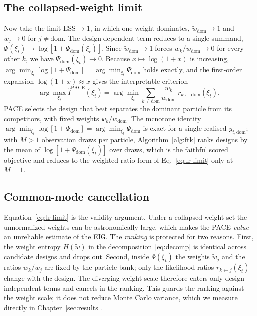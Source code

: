 \subsection{The collapsed-weight limit}
\label{sec:m-collapse}

Now take the limit $\mathrm{ESS}\to1$, in which one weight dominates,
$\tilde w_{\mathrm{dom}}\to1$ and $\tilde w_j\to0$ for $j\ne\mathrm{dom}$. The
design-dependent term reduces to a single summand,
$\bar\Phi(\xi_t)\to\log[1+\Psi_{\mathrm{dom}}(\xi_t)]$. Since $\tilde w_{\mathrm{dom}}\to1$
forces $w_k/w_{\mathrm{dom}}\to0$ for every other $k$, we have
$\Psi_{\mathrm{dom}}(\xi_t)\to0$. Because $x\mapsto\log(1+x)$ is increasing,
$\arg\min_{\xi_t}\log[1+\Psi_{\mathrm{dom}}]=\arg\min_{\xi_t}\Psi_{\mathrm{dom}}$ holds
exactly, and the first-order expansion $\log(1+x)\approx x$ gives the interpretable
criterion
\begin{equation}
\label{eq:lr-limit}
\arg\max_{\xi_t}\hat I^{\mathrm{PACE}}(\xi_t)
= \arg\min_{\xi_t}\sum_{k\ne\mathrm{dom}}\frac{w_k}{w_{\mathrm{dom}}}\,r_{k\leftarrow\mathrm{dom}}(\xi_t).
\end{equation}
PACE selects the design that best separates the dominant particle from its
competitors, with fixed weights $w_k/w_{\mathrm{dom}}$. The monotone identity
$\arg\min_{\xi_t}\log[1+\Psi_{\mathrm{dom}}]=\arg\min_{\xi_t}\Psi_{\mathrm{dom}}$ is exact
for a single realised $y_{t,\mathrm{dom}}$; with $M{>}1$ observation draws per particle,
Algorithm~\ref{alg:ftk} ranks designs by the mean of $\log[1+\Psi_{\mathrm{dom}}(\xi_t)]$
over draws, which is the faithful scored objective and reduces to the weighted-ratio
form of Eq.~\eqref{eq:lr-limit} only at $M{=}1$.

\subsection{Common-mode cancellation}
\label{sec:m-cancellation}

Equation~\eqref{eq:lr-limit} is the validity argument. Under a collapsed weight set the
unnormalized weights can be astronomically large, which makes the PACE \emph{value} an
unreliable estimate of the EIG. The \emph{ranking} is protected for two reasons.
First, the weight entropy $H(\tilde w)$ in the decomposition~\eqref{eq:decomp} is
identical across candidate designs and drops out. Second, inside $\bar\Phi(\xi_t)$ the
weights $\tilde w_j$ and the ratios $w_k/w_j$ are fixed by the particle bank; only the
likelihood ratios $r_{k\leftarrow j}(\xi_t)$ change with the design. The diverging
weight scale therefore enters only design-independent terms and cancels in the
ranking. This guards the ranking against the weight scale; it does not reduce Monte
Carlo variance, which we measure directly in Chapter~\ref{sec:results}.

